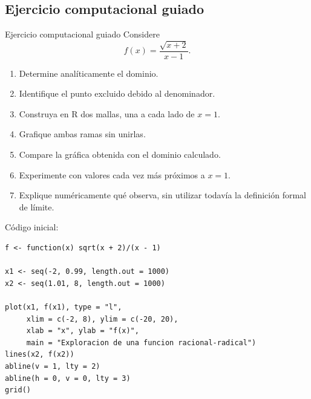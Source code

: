 \documentclass[aspectratio=169,10pt]{beamer}
\begin{document}
\subsection{Ejercicio computacional guiado}
\begin{frame}{Ejercicio computacional guiado}
Considere
\[
f(x)=\frac{\sqrt{x+2}}{x-1}.
\]

\begin{enumerate}
    \item Determine analíticamente el dominio.
    \item Identifique el punto excluido debido al denominador.
    \item Construya en R dos mallas, una a cada lado de $x=1$.
    \item Grafique ambas ramas sin unirlas.
    \item Compare la gráfica obtenida con el dominio calculado.
    \item Experimente con valores cada vez más próximos a $x=1$.
    \item Explique numéricamente qué observa, sin utilizar todavía la definición
    formal de límite.
\end{enumerate}

Código inicial:

\begin{verbatim}
f <- function(x) sqrt(x + 2)/(x - 1)

x1 <- seq(-2, 0.99, length.out = 1000)
x2 <- seq(1.01, 8, length.out = 1000)

plot(x1, f(x1), type = "l",
     xlim = c(-2, 8), ylim = c(-20, 20),
     xlab = "x", ylab = "f(x)",
     main = "Exploracion de una funcion racional-radical")
lines(x2, f(x2))
abline(v = 1, lty = 2)
abline(h = 0, v = 0, lty = 3)
grid()
\end{verbatim}
\end{frame}
\end{document}
